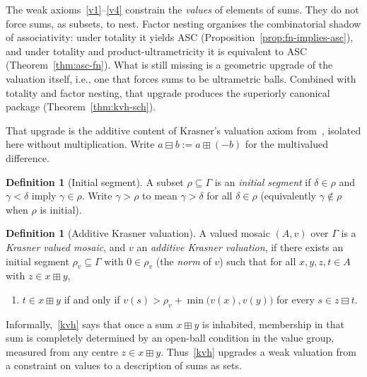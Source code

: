\documentclass[11pt]{amsart}
\theoremstyle{plain}
\theoremstyle{definition}
\newtheorem{definition}[theorem]{Definition}
\theoremstyle{remark}
\begin{document}
The weak axioms~\eqref{v1}--\eqref{v4} constrain the \emph{values} of elements of sums. They do not force sums, as subsets, to nest. Factor nesting organises the combinatorial shadow of associativity: under totality it yields ASC (Proposition~\ref{prop:fn-implies-asc}), and under totality and product-ultrametricity it is equivalent to ASC (Theorem~\ref{thm:asc-fn}). What is still missing is a geometric upgrade of the valuation itself, i.e., one that forces sums to be ultrametric balls. Combined with totality and factor nesting, that upgrade produces the superiorly canonical package (Theorem~\ref{thm:kvh-sch}).

That upgrade is the additive content of Krasner's valuation axiom from~\cite{Lin23}, isolated here without multiplication. Write \(a\boxminus b:=a\boxplus(-b)\) for the multivalued difference.

\begin{definition}[Initial segment]
\label{def:initial}
A subset \(\rho\subseteq\Gamma\) is an \emph{initial segment} if \(\delta\in\rho\) and \(\gamma<\delta\) imply \(\gamma\in\rho\). Write \(\gamma>\rho\) to mean \(\gamma>\delta\) for all \(\delta\in\rho\) (equivalently \(\gamma\notin\rho\) when \(\rho\) is initial).
\end{definition}

\begin{definition}[Additive Krasner valuation]
\label{def:kvh}
A valued mosaic \((A,v)\) over \(\Gamma\) is a \emph{Krasner valued mosaic}, and \(v\) an \emph{additive Krasner valuation}, if there exists an initial segment \(\rho_v\subseteq\Gamma\) with \(0\in\rho_v\) (the \emph{norm} of \(v\)) such that for all \(x,y,z,t\in A\) with \(z\in x\boxplus y\),
\begin{enumerate}[label=(KVH)]
\item\label{kvh}
\(t\in x\boxplus y\) if and only if \(v(s)>\rho_v+\min\bigl(v(x),v(y)\bigr)\) for every \(s\in z\boxminus t\).
\end{enumerate}
\end{definition}

Informally,~\eqref{kvh} says that once a sum \(x\boxplus y\) is inhabited, membership in that sum is completely determined by an open-ball condition in the value group, measured from any centre \(z\in x\boxplus y\). Thus~\eqref{kvh} upgrades a weak valuation from a constraint on values to a description of sums as sets.
\end{document}
